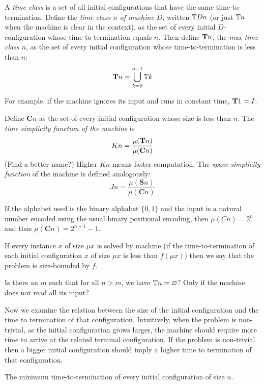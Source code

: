 A \emph{time class} is a set of all initial configurations that have the same time-to-termination.
Define the \emph{time class $n$ of machine $D$},
written $\mathbb{T} D n$ (or just $\mathbb{T} n$ when the machine is clear in the context),
as the set of every initial $D$-configuration
whose time-to-termination equals $n$.
Then define $\mathbf{T} n$, the \emph{max-time class $n$},
as the set of every initial configuration whose time-to-termination is less than $n$:
\begin{equation}
    \mathbf{T} n = \bigcup_{k = 0}^{n - 1} \mathbb{T} k
\end{equation}

For example, if the machine ignores its input and runs in constant time,
$\mathbf{T} 1 = I$.

\newcommand{\Cset}{\mathbf{C}}
Define $\Cset n$ as the set of every initial configuration whose size is less than $n$.
The \emph{time simplicity function of the machine} is
\begin{equation}
    K n = \frac{\mu(\Teqsum n)}{\mu(\Cset n)}
\end{equation}
(Find a better name?)
Higher $K n$ means faster computation.
The \emph{space simplicity function} of the machine is defined analogously:
\begin{equation}
    J n = \frac{\mu(\mathbf S n)}{\mu(\Cset n)}
\end{equation}

If the alphabet used is the binary alphabet $\{ 0, 1 \}$
and the input is a natural number encoded using the usual binary positional encoding,
then $\mu (C n) = 2^n$ and thus $\mu (\Cset n) = 2^{n + 1} - 1$.

If every instance $x$ of size $\mu x$ is solved by machine
(if the time-to-termination of each initial configuration $x$ of size $\mu x$ is less than $f(\mu x)$)
then we say that the problem is size-bounded by $f$.

Is there an $m$ such that for all $n > m$, we have $\mathbb{T} n = \varnothing$?
Only if the machine does not read all its input?

Now we examine the relation between the size of the initial configuration
and the time to termination of that configuration.
Intuitively, when the problem is non-trivial, as the initial configuration grows larger,
the machine should require more time to arrive at the related terminal configuration.
If the problem is non-trivial then a bigger initial configuration
should imply a higher time to termination of that configuration.

The minimum time-to-termination of every initial configuration of size $n$.

